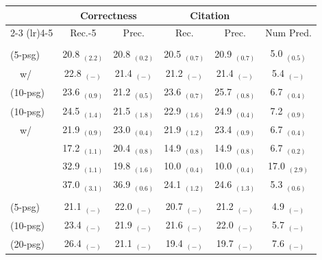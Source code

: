\documentclass[11pt]{article}
\newcommand\tf[1]{\textbf{#1}}
\newcommand{\vani}{{\sc{Vanilla}}}
\newcommand{\summ}{{\sc{Summ}}}
\newcommand{\snippet}{{\sc{Snippet}}}
\newcommand{\interact}{{\sc{Interact}}}
\newcommand{\search}{{\sc{InlineSearch}}}
\newcommand{\rerank}{{\sc{Rerank}}}
\newcommand{\close}{{\sc{ClosedBook}}}
\newcommand{\oracle}{{\sc{Oracle}}}
\newcommand{\tableskip}{\noalign{\vskip 2pt}}
\newcommand{\headercolorlong}{\rowcolor{gray!17}}
\begin{document}
\begin{table}[ht]
    \centering
    \small
        \begin{tabular}{lccccc}
            \toprule
             & \multicolumn{2}{c}{\tf{Correctness}} & \multicolumn{2}{c}{\tf{Citation} }\\
             \cmidrule(lr){2-3} \cmidrule(lr){4-5}
            &  Rec.-5 & Prec. & Rec. & Prec. & Num Pred. \\
            \midrule
            \rowcolor{gray!16}
            \multicolumn{6}{c}{\textbf{ChatGPT}} \\
            \tableskip
            \vani{} (5-psg) & 20.8 $_{(2.2)}$ & 20.8 $_{(0.2)}$ & 20.5 $_{(0.7)}$ & 20.9 $_{(0.7)}$ & 5.0 $_{(0.5)}$   \\
            ~~w/ \rerank{} & 22.8 $_{(-)}$ & 21.4 $_{(-)}$ & 21.2 $_{(-)}$ & 21.4 $_{(-)}$ & 5.4 $_{(-)}$ \\
            \summ{} (10-psg) & 23.6 $_{(0.9)}$ & 21.2 $_{(0.5)}$ & 23.6 $_{(0.7)}$ & 25.7 $_{(0.8)}$ & 6.7 $_{(0.4)}$   \\
            \snippet{} (10-psg) & 24.5 $_{(1.4)}$ & 21.5 $_{(1.8)}$ & 22.9 $_{(1.6)}$ & 24.9 $_{(0.4)}$ & 7.2 $_{(0.9)}$   \\
            ~~w/ \interact{} & 21.9 $_{(0.9)}$ & 23.0 $_{(0.4)}$ & 21.9 $_{(1.2)}$ & 23.4 $_{(0.9)}$ & 6.7 $_{(0.4)}$   \\
         \search{} & 17.2 $_{(1.1)}$ & 20.4 $_{(0.8)}$ & 14.9 $_{(0.8)}$ & 14.9 $_{(0.8)}$ & 6.7 $_{(0.2)}$   \\
            \close{} & 32.9 $_{(1.1)}$ & 19.8 $_{(1.6)}$ & 10.0 $_{(0.4)}$ & 10.0 $_{(0.4)}$ & 17.0 $_{(2.9)}$   \\
         \oracle{} & 37.0 $_{(3.1)}$ & 36.9 $_{(0.6)}$ & 24.1 $_{(1.2)}$ & 24.6 $_{(1.3)}$ & 5.3 $_{(0.6)}$   \\



            \headercolorlong
            \tableskip
            \multicolumn{6}{c}{\textbf{ChatGPT-16K}} \\
            \tableskip
            \vani{} (5-psg)  & 21.1 $_{(-)}$&22.0 $_{(-)}$&20.7 $_{(-)}$&21.2 $_{(-)}$&4.9 $_{(-)}$\\ 
            \vani{} (10-psg) & 23.4 $_{(-)}$&21.9 $_{(-)}$&21.6 $_{(-)}$&22.0 $_{(-)}$&5.7 $_{(-)}$\\
            \vani{} (20-psg) & 26.4 $_{(-)}$&21.1 $_{(-)}$&19.4 $_{(-)}$&19.7 $_{(-)}$&7.6 $_{(-)}$\\


\end{tabular}
\end{table}
\end{document}
